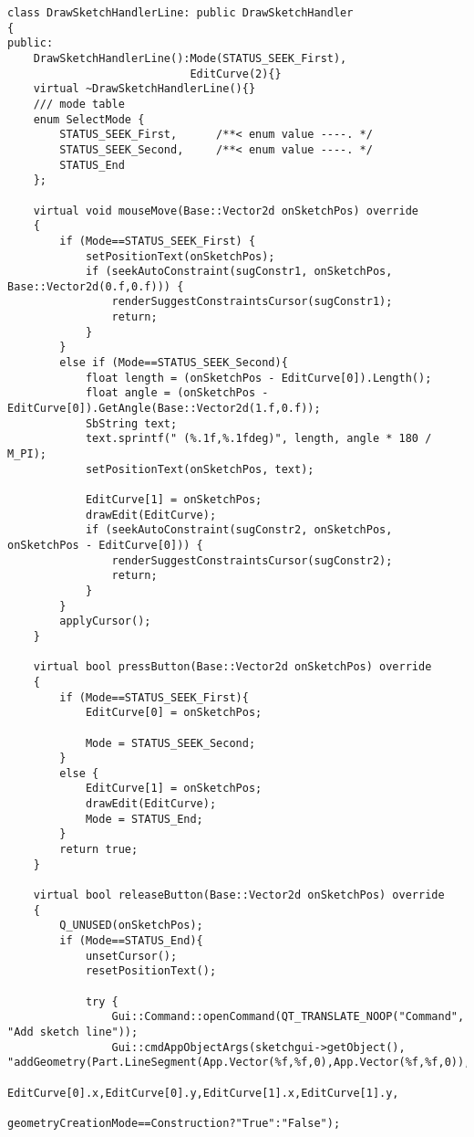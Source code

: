 \documentclass[12pt,twoside,a4paper]{book}
\begin{document}
    \begin{lstlisting}
class DrawSketchHandlerLine: public DrawSketchHandler
{
public:
    DrawSketchHandlerLine():Mode(STATUS_SEEK_First),
                            EditCurve(2){}
    virtual ~DrawSketchHandlerLine(){}
    /// mode table
    enum SelectMode {
        STATUS_SEEK_First,      /**< enum value ----. */
        STATUS_SEEK_Second,     /**< enum value ----. */
        STATUS_End
    };

    virtual void mouseMove(Base::Vector2d onSketchPos) override
    {
        if (Mode==STATUS_SEEK_First) {
            setPositionText(onSketchPos);
            if (seekAutoConstraint(sugConstr1, onSketchPos, Base::Vector2d(0.f,0.f))) {
                renderSuggestConstraintsCursor(sugConstr1);
                return;
            }
        }
        else if (Mode==STATUS_SEEK_Second){
            float length = (onSketchPos - EditCurve[0]).Length();
            float angle = (onSketchPos - EditCurve[0]).GetAngle(Base::Vector2d(1.f,0.f));
            SbString text;
            text.sprintf(" (%.1f,%.1fdeg)", length, angle * 180 / M_PI);
            setPositionText(onSketchPos, text);

            EditCurve[1] = onSketchPos;
            drawEdit(EditCurve);
            if (seekAutoConstraint(sugConstr2, onSketchPos, onSketchPos - EditCurve[0])) {
                renderSuggestConstraintsCursor(sugConstr2);
                return;
            }
        }
        applyCursor();
    }

    virtual bool pressButton(Base::Vector2d onSketchPos) override
    {
        if (Mode==STATUS_SEEK_First){
            EditCurve[0] = onSketchPos;

            Mode = STATUS_SEEK_Second;
        }
        else {
            EditCurve[1] = onSketchPos;
            drawEdit(EditCurve);
            Mode = STATUS_End;
        }
        return true;
    }

    virtual bool releaseButton(Base::Vector2d onSketchPos) override
    {
        Q_UNUSED(onSketchPos);
        if (Mode==STATUS_End){
            unsetCursor();
            resetPositionText();

            try {
                Gui::Command::openCommand(QT_TRANSLATE_NOOP("Command", "Add sketch line"));
                Gui::cmdAppObjectArgs(sketchgui->getObject(), "addGeometry(Part.LineSegment(App.Vector(%f,%f,0),App.Vector(%f,%f,0)),%s)",
                          EditCurve[0].x,EditCurve[0].y,EditCurve[1].x,EditCurve[1].y,
                          geometryCreationMode==Construction?"True":"False");


\end{lstlisting}
\end{document}
